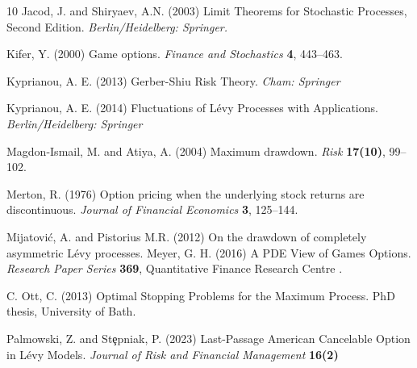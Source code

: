 \documentclass[10pt]{amsart}
\begin{document}
\begin{thebibliography}{10}
			 Jacod, J. and Shiryaev, A.N. (2003) Limit Theorems for Stochastic Processes, Second Edition. {\it Berlin/Heidelberg: Springer.}
			
			 Kifer, Y. (2000) Game options. {\it Finance and Stochastics} {\bf 4}, 443--463.
			
			 Kyprianou, A. E. (2013) Gerber-Shiu Risk Theory. {\it Cham: Springer}
			
			 Kyprianou, A. E. (2014) Fluctuations of Lévy Processes with Applications. {\it Berlin/Heidelberg: Springer}
			
			Magdon-Ismail, M. and Atiya, A. (2004) Maximum drawdown. {\it Risk} {\bf 17(10)}, 99--102.
			
			Merton, R. (1976)
			Option pricing when the underlying stock returns are discontinuous.
			{\it Journal of Financial Economics} {\bf 3}, 125--144.
			
			 Mijatović, A. and Pistorius M.R. (2012) On the drawdown of completely asymmetric L\'evy processes.
			 Meyer, G. H.  (2016) A PDE View of Games Options. {\it Research Paper Series} {\bf 369}, Quantitative Finance Research Centre .
			
			
			
			 C. Ott, C. (2013) Optimal Stopping Problems for the Maximum Process. PhD thesis, University of Bath.
			
			 Palmowski, Z. and St\c{e}pniak, P. (2023) Last-Passage American Cancelable Option in L\'evy Models. {\it Journal of Risk and Financial Management} {\bf 16(2)}
			

\end{thebibliography}
\end{document}
